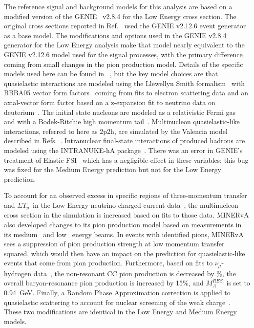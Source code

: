 \documentclass[aps,prl,twocolumn,showpacs,superscriptaddress, floatfix,10pt]{revtex4-2}
\newcommand{\sumtp}{\ensuremath{\Sigma T_{p}}}
\newcommand{\deborahAdd}[1]{{\color{black} \protect #1}}
\begin{document}
The reference signal and background models for this analysis are based on a modified version of the GENIE~\cite{Andreopoulos:2009rq} v2.8.4 for the Low Energy cross section.  The original cross sections reported in Ref.~\cite{MINERvA:2022mnw} used the GENIE v2.12.6 event generator as a base model.  The modifications and options used in the GENIE v2.8.4 generator for the Low Energy analysis make that model nearly equivalent to the GENIE v2.12.6 model used for the signal processes, with the primary difference coming from small changes in the pion production model.  Details of the specific models used here can be found in ~\cite{MINERvA:2022mnw}, but the key model choices are that quasielastic interactions are modeled using the Llewellyn Smith formalism~\cite{LlewellynSmith:1971zm} with BBBA05 vector form factors~\cite{Bradford:2006yz} coming from fits to electron scattering data and an axial-vector form factor based on a z-expansion fit to neutrino data on deuterium~\citep{Meyer:2016oeg}. The initial state nucleons are modeled as a relativistic Fermi gas~\cite{Smith:1972xh} and with a Bodek-Ritchie high momentum tail~\cite{Bodek:1981wr}.  Multinucleon quasielastic-like interactions, referred to here as 2p2h, are simulated by the Valencia model described in Refs.~\cite{Nieves:2011pp,Gran:2013kda,Schwehr:2016pvn}.  Intranuclear final-state interactions of produced hadrons are modeled using the INTRANUKE-hA package~\cite{Dytman:2007zz}.  There was an error in GENIE's treatment of Elastic FSI~\cite{Harewood:2019rzy} which has a negligible effect in these variables; this bug was fixed for the Medium Energy prediction but not for the Low Energy prediction.  

To account for an observed excess in specific regions of three-momentum transfer and \sumtp~in the Low Energy neutrino charged current data~\cite{Rodrigues:2015hik}, the multinucleon cross section in the simulation is increased based on fits to those data.  MINERvA also developed changes to its pion production model based on measurements in its medium~\cite{MINERvA:2022djk} and low~\cite{MINERvA:2019kfr} energy beams.  In events with identified pions, MINERvA sees a suppression of pion production strength at low momentum transfer squared, which would then have an impact on the prediction for quasielastic-like events that come from pion production. Furthermore, based on fits to $\nu_{\mu}$-hydrogen data~\cite{Rodrigues:2016xjj}, the non-resonant CC pion production is decreased by \deborahAdd{57\%}, 
the overall baryon-resonance pion production is increased by 15\%, and $M_{A}^{RES}$~is set to 0.94~GeV.  
Finally, a Random Phase Approximation correction is 
applied to quasielastic scattering to account for nuclear screening of the weak charge~\cite{Nieves:2004wx,Gran:2017psn}.
These two modifications are identical in the Low Energy and Medium Energy models. 
\end{document}
